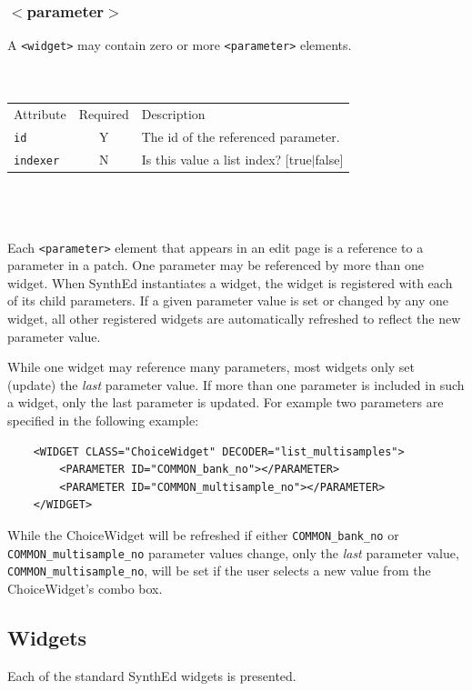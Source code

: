 \documentclass[a4paper,twoside,12pt]{article}
\newcommand{\code}[1]{\color{red}\texttt{#1}\color{black}}
\begin{document}
\subsubsection{$<$parameter$>$}
A \code{<widget>}{} may contain zero or more \code{<parameter>}{}
elements.
\\
\\
\\
\begin{tabular}{|l|c|p{9cm}|}
\hline
Attribute & Required & Description \\
\code{id} & Y & The id of the referenced parameter. \\
\code{indexer} & N & Is this value a list index? [true$|$false] \\
\hline
\end{tabular}
\\
\\
\\
Each \code{<parameter>}{} element that appears in an edit page is
a reference to a parameter in a patch. One parameter may be
referenced by more than one widget. When SynthEd instantiates a
widget, the widget is registered with each of its child
parameters. If a given parameter value is set or changed by any
one widget, all other registered widgets are automatically
refreshed to reflect the new parameter value.

While one widget may reference many parameters, most widgets only
set (update) the {\it last} parameter value. If more than one
parameter is included in such a widget, only the last parameter is
updated. For example two parameters are specified in the following
example:

\begin{verbatim}
    <WIDGET CLASS="ChoiceWidget" DECODER="list_multisamples">
        <PARAMETER ID="COMMON_bank_no"></PARAMETER>
        <PARAMETER ID="COMMON_multisample_no"></PARAMETER>
    </WIDGET>
\end{verbatim}

While the ChoiceWidget will be refreshed if either
\code{COMMON\_bank\_no}{} or \code{COMMON\_multisample\_no}{}
parameter values change, only the {\it last} parameter value,
\code{COMMON\_multisample\_no}{}, will be set if the user selects
a new value from the ChoiceWidget's combo box.

\subsection{Widgets}
Each of the standard SynthEd widgets is presented.
\end{document}
